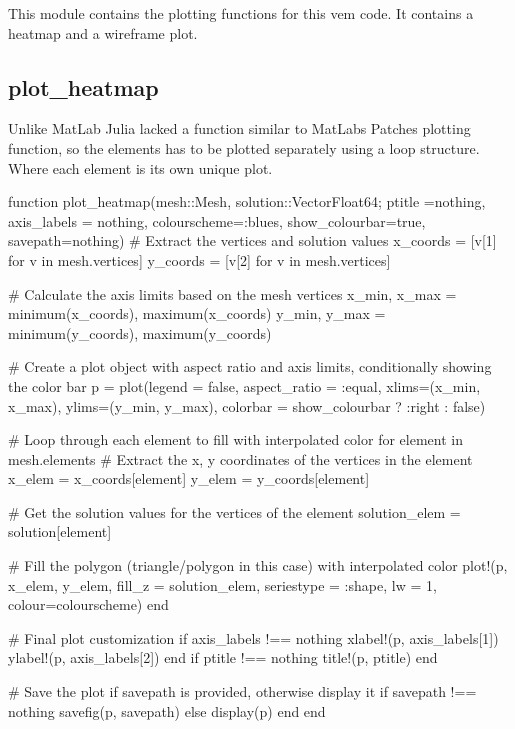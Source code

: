 \documentclass{report}
\begin{document}
This module contains the plotting functions for this vem code. It contains a heatmap and a wireframe plot.

\subsection{plot\_heatmap}
Unlike MatLab Julia lacked a function similar to MatLabs Patches plotting function, so the elements has to be plotted separately using a loop structure. Where each element is its own unique plot.


\begin{jllisting}[style=JuliaStyle]
function plot_heatmap(mesh::Mesh, solution::Vector{Float64}; ptitle =nothing, axis_labels = nothing, colourscheme=:blues, show_colourbar=true, savepath=nothing)
    # Extract the vertices and solution values
    x_coords = [v[1] for v in mesh.vertices]
    y_coords = [v[2] for v in mesh.vertices]

    # Calculate the axis limits based on the mesh vertices
    x_min, x_max = minimum(x_coords), maximum(x_coords)
    y_min, y_max = minimum(y_coords), maximum(y_coords)

    # Create a plot object with aspect ratio and axis limits, conditionally showing the color bar
    p = plot(legend = false, aspect_ratio = :equal, xlims=(x_min, x_max), ylims=(y_min, y_max), 
             colorbar = show_colourbar ? :right : false)

    # Loop through each element to fill with interpolated color
    for element in mesh.elements
        # Extract the x, y coordinates of the vertices in the element
        x_elem = x_coords[element]
        y_elem = y_coords[element]
        
        # Get the solution values for the vertices of the element
        solution_elem = solution[element]

        # Fill the polygon (triangle/polygon in this case) with interpolated color
        plot!(p, x_elem, y_elem, fill_z = solution_elem, seriestype = :shape, lw = 1, colour=colourscheme)
    end

    # Final plot customization
    if axis_labels !== nothing
        xlabel!(p, axis_labels[1])
        ylabel!(p, axis_labels[2])
    end
    if ptitle !== nothing
        title!(p, ptitle)
    end


    # Save the plot if savepath is provided, otherwise display it
    if savepath !== nothing
        savefig(p, savepath)
    else
        display(p)
    end
end
\end{jllisting}
\end{document}
